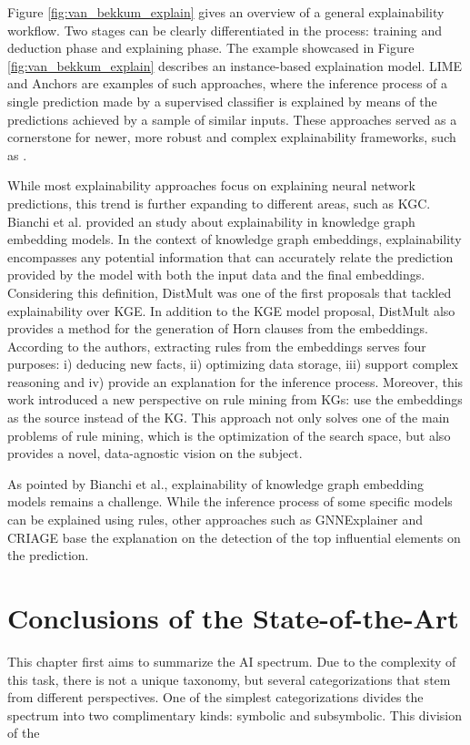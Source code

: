 Figure \ref{fig:van_bekkum_explain} gives an overview of a general explainability workflow. Two stages can be clearly differentiated in the process: training and deduction phase and explaining phase. The example showcased in Figure \ref{fig:van_bekkum_explain} describes an instance-based explaination model. LIME \cite{ribeiro_lime_2016} and Anchors \cite{Ribeiro_Singh_Guestrin_2018} are examples of such approaches, where the inference process of a single prediction made by a supervised classifier is explained by means of the predictions achieved by a sample of similar inputs. These approaches served as a cornerstone for newer, more robust and complex explainability frameworks, such as \cite{arya_one_2019}. 

While most explainability approaches focus on explaining neural network predictions, this trend is further expanding to different areas, such as KGC. Bianchi et al. \citep{bianchi_kge_explainability_2020} provided an study about explainability in knowledge graph embedding models. In the context of knowledge graph embeddings, explainability encompasses any potential information that can accurately relate the prediction provided by the model with both the input data and the final embeddings. Considering this definition, DistMult \citep{distmult} was one of the first proposals that tackled explainability over KGE. In addition to the KGE model proposal, DistMult also provides a method for the generation of Horn clauses from the embeddings. According to the authors, extracting rules from the embeddings serves four purposes: i) deducing new facts, ii) optimizing data storage, iii) support complex reasoning and iv) provide an explanation for the inference process. Moreover, this work introduced a new perspective on rule mining from KGs: use the embeddings as the source instead of the KG. This approach not only solves one of the main problems of rule mining, which is the optimization of the search space, but also provides a novel, data-agnostic vision on the subject. 

As pointed by Bianchi et al., explainability of knowledge graph embedding models remains a challenge. While the inference process of some specific models can be explained using rules, other approaches such as GNNExplainer \citep{ying_2019_gnnexplainer} and CRIAGE \citep{pezeshkpour_2019_investigating} base the explanation on the detection of the top influential elements on the prediction. 

\section{Conclusions of the State-of-the-Art}
This chapter first aims to summarize the AI spectrum. Due to the complexity of this task, there is not a unique taxonomy, but several categorizations that stem from different perspectives. One of the simplest categorizations divides the spectrum into two complimentary kinds: symbolic and subsymbolic. This division of the

